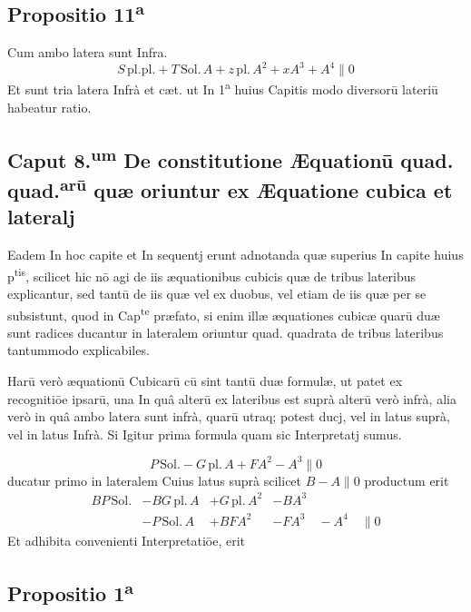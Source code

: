 \documentclass[11pt,a4paper]{article}
\begin{document}
\subsection*{Propositio 11\textsuperscript{a}}

Cum ambo latera sunt Infra.
\[ S\,\mathrm{pl.pl.} + T\,\mathrm{Sol.}\,A + z\,\mathrm{pl.}\,A^{2} + xA^{3} + A^{4} \parallel 0 \]
Et sunt tria latera Infrà et cæt. ut In 1\textsuperscript{a} huius Capitis modo diversorū lateriū habeatur ratio.

\subsection*{Caput 8.\textsuperscript{um} De constitutione Æquationū quad. quad.\textsuperscript{arū} quæ oriuntur ex Æquatione cubica et lateralj}

Eadem In hoc capite et In sequentj erunt adnotanda quæ superius In capite  huius p\textsuperscript{tis}, scilicet hic nō agi de iis æquationibus cubicis quæ de tribus lateribus explicantur, sed tantū de iis quæ vel ex duobus, vel etiam de iis quæ per se subsistunt, quod in Cap\textsuperscript{te} præfato, si enim illæ æquationes cubicæ quarū duæ sunt radices ducantur in lateralem oriuntur quad. quadrata de tribus lateribus tantummodo explicabiles.

Harū verò æquationū Cubicarū cū sint tantū duæ formulæ, ut patet ex recognitiōe ipsarū, una In quâ alterū ex lateribus est suprà alterū verò infrà, alia verò in quâ ambo latera sunt infrà, quarū utraq; potest ducj, vel in latus suprà, vel in latus Infrà. Si Igitur prima formula quam sic Interpretatj sumus.


\[ P\,\mathrm{Sol.} - G\,\mathrm{pl.}\,A + FA^{2} - A^{3} \parallel 0 \]
ducatur primo in lateralem Cuius latus suprà scilicet $B - A \parallel 0$ productum erit
\[ \begin{array}{llll} BP\,\mathrm{Sol.} & - BG\,\mathrm{pl.}\,A & + G\,\mathrm{pl.}\,A^{2} & - BA^{3} \\ & - P\,\mathrm{Sol.}\,A & + BFA^{2} & - FA^{3} \quad - A^{4} \quad \parallel 0 \end{array} \]
Et adhibita convenienti Interpretatiōe, erit

\subsection*{Propositio 1\textsuperscript{a}}
\end{document}
